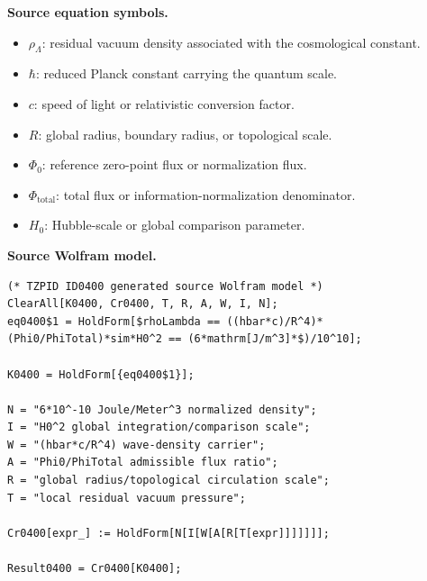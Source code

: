 \begin{minipage}[t]{0.49\linewidth}
\begingroup
\small
\raggedright
\textbf{Source equation symbols.}\par
\begin{itemize}[leftmargin=1.35em,itemsep=1pt,topsep=1pt,parsep=0pt]
    \item $\rho_{\Lambda}$: residual vacuum density associated with the cosmological constant.
    \item $\hbar$: reduced Planck constant carrying the quantum scale.
    \item $c$: speed of light or relativistic conversion factor.
    \item $R$: global radius, boundary radius, or topological scale.
    \item $\Phi_0$: reference zero-point flux or normalization flux.
    \item $\Phi_{\mathrm{total}}$: total flux or information-normalization denominator.
    \item $H_0$: Hubble-scale or global comparison parameter.
\end{itemize}
\endgroup
\end{minipage}\hfill
\begin{minipage}[t]{0.47\linewidth}
\begingroup
\scriptsize
\raggedright
\textbf{Source Wolfram model.}\par
\begin{Verbatim}[fontsize=\tiny,breaklines=true,breakanywhere=true]
(* TZPID ID0400 generated source Wolfram model *)
ClearAll[K0400, Cr0400, T, R, A, W, I, N];
eq0400$1 = HoldForm[$rhoLambda == ((hbar*c)/R^4)*(Phi0/PhiTotal)*sim*H0^2 == (6*mathrm[J/m^3]*$)/10^10];

K0400 = HoldForm[{eq0400$1}];

N = "6*10^-10 Joule/Meter^3 normalized density";
I = "H0^2 global integration/comparison scale";
W = "(hbar*c/R^4) wave-density carrier";
A = "Phi0/PhiTotal admissible flux ratio";
R = "global radius/topological circulation scale";
T = "local residual vacuum pressure";

Cr0400[expr_] := HoldForm[N[I[W[A[R[T[expr]]]]]]];

Result0400 = Cr0400[K0400];
\end{Verbatim}
\endgroup
\end{minipage}

